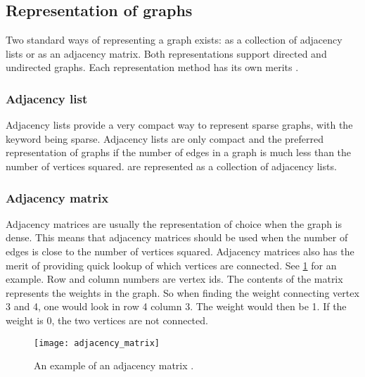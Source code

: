 

\subsection{Representation of graphs}

Two standard ways of representing a graph exists: as a collection of adjacency lists or as an adjacency matrix. Both representations support directed and undirected graphs. Each representation method has its own merits \cite{Cormen2009}.

\subsubsection{Adjacency list}
Adjacency lists provide a very compact way to represent sparse graphs, with the keyword being sparse. Adjacency lists are only compact and the preferred representation of graphs if the number of edges in a graph is much less than the number of vertices squared.  are represented as a collection of adjacency lists.

\subsubsection{Adjacency matrix}
Adjacency matrices are usually the representation of choice when the graph is dense. This means that adjacency matrices should be used when the number of edges is close to the number of vertices squared. Adjacency matrices also has the merit of providing quick lookup of which vertices are connected. See \cref{fig:adjacency_matrix} for an example. Row and column numbers are vertex ids. The contents of the matrix represents the weights in the graph. So when finding the weight connecting vertex 3 and 4, one would look in row 4 column 3. The weight would then be 1. If the weight is 0, the two vertices are not connected.

\begin{figure}[ht!]
    \centering
    \texttt{[image: adjacency\_matrix]}
    \caption{An example of an adjacency matrix \cite{Cormen2009}.}
    \label{fig:adjacency_matrix}
  \end{figure}


